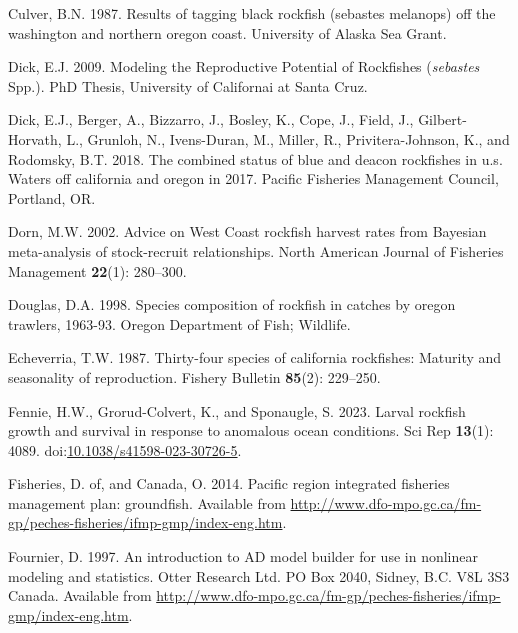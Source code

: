 \documentclass[11pt,
  english,
  letterpaper,
]{article}
\newlength{\cslhangindent}
\newenvironment{CSLReferences}[2] %
 {%
  \setlength{\parindent}{0pt}
  \ifodd #1 \everypar{\setlength{\hangindent}{\cslhangindent}}\ignorespaces\fi
  \ifnum #2 > 0
  \setlength{\parskip}{#2\baselineskip}
  \fi
 }%
 {}
\begin{document}
\begin{CSLReferences}{1}{0}
\leavevmode{}%
Culver, B.N. 1987. Results of tagging black rockfish (sebastes melanops) off the washington and northern oregon coast. University of Alaska Sea Grant.

\leavevmode{}%
Dick, E.J. 2009. Modeling the {Reproductive} {Potential} of {Rockfishes} (\emph{sebastes} {Spp}.). PhD Thesis, University of Californai at Santa Cruz.

\leavevmode{}%
Dick, E.J., Berger, A., Bizzarro, J., Bosley, K., Cope, J., Field, J., Gilbert-Horvath, L., Grunloh, N., Ivens-Duran, M., Miller, R., Privitera-Johnson, K., and Rodomsky, B.T. 2018. The combined status of blue and deacon rockfishes in u.s. Waters off california and oregon in 2017. Pacific Fisheries Management Council, Portland, {OR}.

\leavevmode{}%
Dorn, M.W. 2002. Advice on {West} {Coast} rockfish harvest rates from {B}ayesian meta-analysis of stock-recruit relationships. North American Journal of Fisheries Management \textbf{22}(1): 280--300.

\leavevmode{}%
Douglas, D.A. 1998. Species composition of rockfish in catches by oregon trawlers, 1963-93. Oregon Department of Fish; Wildlife.

\leavevmode{}%
Echeverria, T.W. 1987. Thirty-four species of california rockfishes: Maturity and seasonality of reproduction. Fishery Bulletin \textbf{85}(2): 229--250.

\leavevmode{}%
Fennie, H.W., Grorud-Colvert, K., and Sponaugle, S. 2023. Larval rockfish growth and survival in response to anomalous ocean conditions. Sci Rep \textbf{13}(1): 4089. doi:\href{https://doi.org/10.1038/s41598-023-30726-5}{10.1038/s41598-023-30726-5}.

\leavevmode{}%
Fisheries, D. of, and Canada, O. 2014. Pacific region integrated fisheries management plan: groundfish. Available from \url{http://www.dfo-mpo.gc.ca/fm-gp/peches-fisheries/ifmp-gmp/index-eng.htm}.

\leavevmode{}%
Fournier, D. 1997. An introduction to AD model builder for use in nonlinear modeling and statistics. Otter Research Ltd. PO Box 2040, Sidney, B.C. V8L 3S3 Canada. Available from \url{http://www.dfo-mpo.gc.ca/fm-gp/peches-fisheries/ifmp-gmp/index-eng.htm}.


\end{CSLReferences}
\end{document}

